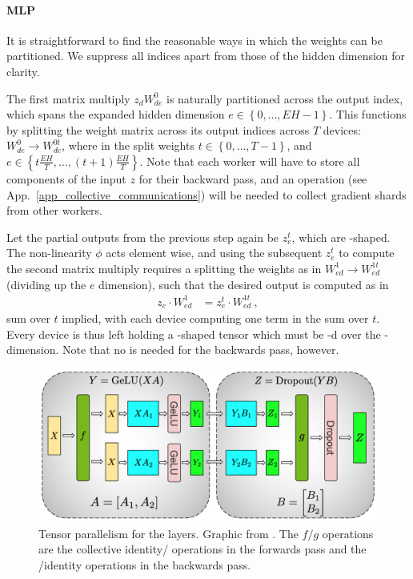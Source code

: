 \documentclass[11pt]{article}
\begin{document}
\paragraph{MLP}
It is straightforward to find the reasonable ways in which the weights can be partitioned. We
suppress all indices apart from those of the hidden dimension for clarity.

The first matrix multiply $ z _{ d }W ^{ 0 } _{ d e } $ is naturally partitioned across the output
index, which spans the expanded hidden dimension $ e\in \left \{ 0, \ldots , EH-1 \right \} $. This
functions by splitting the weight matrix across its output indices across $ T $ devices:  $ W ^{ 0 }
_{ d e } \longrightarrow W ^{ 0t } _{ d e }$, where in the split weights $ t\in \left \{ 0,
    \ldots , T-1  \right \} $, and $ e \in \left \{ t\frac{  EH}{ T } ,
\ldots ,\left ( t+1 \right ) \frac{ EH }{ T } \right \} $. Note that each worker will have to store
all components of the input $ z $ for their backward pass, and an  operation
(see App.~\ref{app_collective_communications}) will be needed to collect gradient shards from other
workers.


Let the partial outputs from the previous step again be $ z _{ e } ^{ t } $, which are
-shaped. The non-linearity $ \phi $ acts element wise, and using the subsequent
$ z _{ e } ^{ t }  $ to compute the second matrix multiply requires a splitting the weights as in $ W ^{ 1 }
_{ e d } \longrightarrow W ^{ 1t } _{  e d}$ (dividing up the $ e $ dimension), such that the desired output is computed as in
\begin{align}
     z _{ e }\cdot W ^{ 1 }_{ ed }&=z _{ e }^{ t }\cdot W ^{ 1t }_{ ed } \ ,
\end{align}
sum over $ t $ implied, with each device computing one term in the sum over $ t $. Every device is thus
left holding a -shaped tensor which must be -d over the
-dimension. Note that no  is needed for the
backwards pass, however.



\begin{figure}[ht]
 \centering
 \includegraphics[scale=.33]{figures/mlp_mp_2.png}
 \caption{Tensor parallelism for the  layers. Graphic from
 \cite{shoeybi2020megatronlm}. The $ f/g $ operations are the collective
identity/ operations in the forwards pass and the /identity
operations in the backwards pass.}
 \label{fig_mlp_tensor_parallel}
\end{figure}
\end{document}
